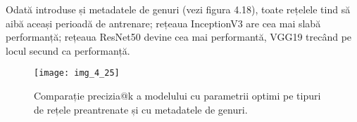 Odată introduse și metadatele de genuri (vezi figura 4.18), toate rețelele tind să aibă aceași perioadă de antrenare; rețeaua InceptionV3 are cea mai slabă performanță; rețeaua ResNet50 devine cea mai performantă, VGG19 trecând pe locul secund ca performanță. 
\begin{figure}[!h]
	\centering
	\texttt{[image: img\_4\_25]}
	\caption[Comparație precizia@k a modelului cu parametrii optimi pe tipuri de rețele preantrenate și cu metadatele de genuri]{Comparație precizia@k a modelului cu parametrii optimi pe tipuri de rețele preantrenate și cu metadatele de genuri.}
\end{figure}